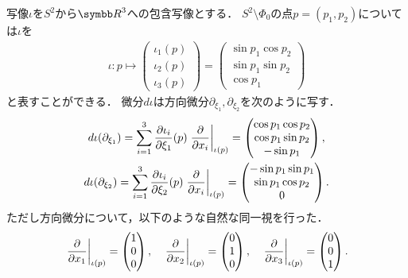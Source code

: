 \documentclass{ltjsarticle}
\begin{document}
写像\(\iota\)を\(S^2\)から\({\Real}^3\)への包含写像とする．
\(S^2 \setminus \Phi_0\)の点\(p = (p_1, p_2)\)については\(\iota\)を
\begin{align*}
    \iota\colon
    p
    \mapsto
    \begin{pmatrix}
        \iota_1(p) \\
        \iota_2(p) \\
        \iota_3(p)
    \end{pmatrix}
    =
    \begin{pmatrix}
        \sin p_1 \cos p_2 \\
        \sin p_1 \sin p_2 \\
        \cos p_1
    \end{pmatrix}
\end{align*}
と表すことができる．
微分\(d\iota\)は方向微分\(\partial_{\xi_1}, \partial_{\xi_2}\)を次のように写す．
\begin{gather*}
    d\iota (\partial_{\xi_1})
    = \sum_{i = 1}^3 \frac{\partial \iota_i}{\partial \xi_1}(p) \left.\frac{\partial}{\partial x_i}\right\lvert_{\iota(p)}
    =
    \begin{pmatrix}
        \cos p_1 \cos p_2 \\
        \cos p_1 \sin p_2 \\
        -\sin p_1
    \end{pmatrix}, \\
    d\iota(\partial_{\xi_2})
    = \sum_{i = 1}^3 \frac{\partial \iota_i}{\partial \xi_2}(p) \left.\frac{\partial}{\partial x_i}\right\lvert_{\iota(p)}
    =
    \begin{pmatrix}
        - \sin p_1 \sin p_1 \\
        \sin p_1 \cos p_2 \\
        0
    \end{pmatrix}.
\end{gather*}
ただし方向微分について，以下のような自然な同一視を行った．
\begin{align*}
    \left.\frac{\partial}{\partial x_1}\right\lvert_{\iota(p)} = \begin{pmatrix}
        1 \\ 0 \\ 0
    \end{pmatrix},
    \quad
    \left.\frac{\partial}{\partial x_2}\right\lvert_{\iota(p)} = \begin{pmatrix}
        0 \\ 1 \\ 0
    \end{pmatrix},
    \quad
    \left.\frac{\partial}{\partial x_3}\right\lvert_{\iota(p)} = \begin{pmatrix}
        0 \\ 0 \\ 1
    \end{pmatrix}.
\end{align*}
\end{document}
